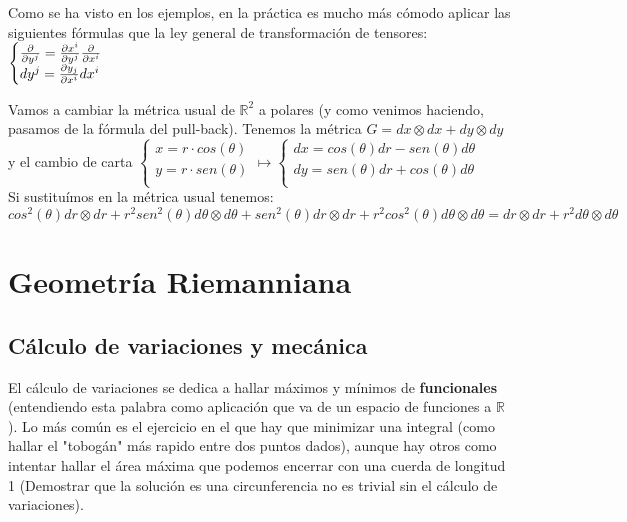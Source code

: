 \documentclass[palatino, bibnumbers]{apuntes}
\begin{document}
Como se ha visto en los ejemplos, en la práctica es mucho más cómodo aplicar las siguientes fórmulas que la ley general de transformación de tensores:
$\begin{cases}
\pdv{y^j}=\pdv{x^i}{y^j}\pdv{x^i}\\
dy^j=\pdv{y_j}{x^i}dx^i\\
\end{cases}$
\newpage
\begin{example}Vamos a cambiar la métrica usual de $ℝ^2$ a polares (y como venimos haciendo, pasamos de la fórmula del pull-back). Tenemos la métrica $G=dx\otimes dx+dy\otimes dy$ y el cambio de carta $\begin{cases}
	x=r\cdot cos (\theta)\\
	y=r\cdot sen(\theta)\\
	\end{cases}\mapsto
	\begin{cases}
	dx=cos(\theta)dr-sen(\theta)d\theta\\
	dy=sen(\theta)dr+cos(\theta)d\theta\\
	\end{cases}$\\
	Si sustituímos en la métrica usual tenemos: $$cos^2(\theta)dr\otimes dr+r^2sen^2(\theta)d\theta\otimes d\theta+sen^2(\theta)dr\otimes dr+r^2cos^2(\theta)d\theta\otimes d\theta=dr\otimes dr+r^2d\theta\otimes d\theta$$
\end{example}
\chapter{Geometría Riemanniana}
\section{Cálculo de variaciones y mecánica}
El cálculo de variaciones se dedica a hallar máximos y mínimos de \textbf{funcionales} (entendiendo esta palabra como aplicación que va de un espacio de funciones a $ℝ$). Lo más común es el ejercicio en el que hay que minimizar una integral (como hallar el "tobogán" más rapido entre dos puntos dados), aunque hay otros como intentar hallar el área máxima que podemos encerrar con una cuerda de longitud 1 (Demostrar que la solución es una circunferencia no es trivial sin el cálculo de variaciones). 
\end{document}
